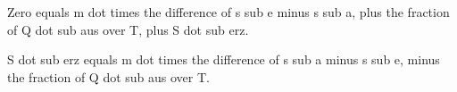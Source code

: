 Zero equals m dot times the difference of s sub e minus s sub a, plus the fraction of Q dot sub aus over T, plus S dot sub erz.

S dot sub erz equals m dot times the difference of s sub a minus s sub e, minus the fraction of Q dot sub aus over T.